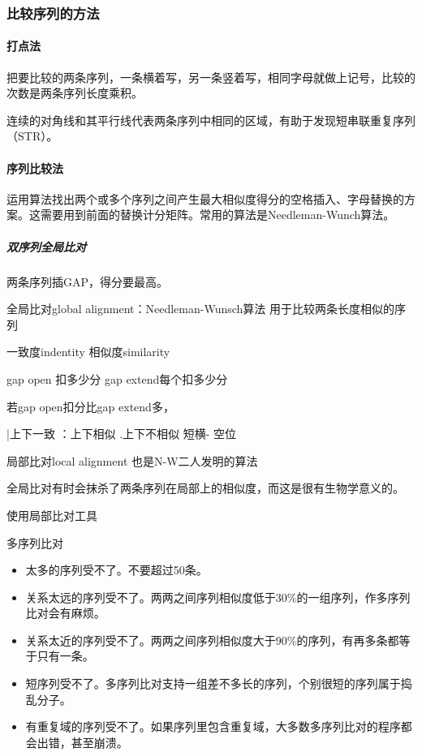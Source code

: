 \subsubsection{比较序列的方法}

\paragraph{打点法}

把要比较的两条序列，一条横着写，另一条竖着写，相同字母就做上记号，比较的次数是两条序列长度乘积。

连续的对角线和其平行线代表两条序列中相同的区域，有助于发现短串联重复序列（STR）。

\paragraph{序列比较法}

运用算法找出两个或多个序列之间产生最大相似度得分的空格插入、字母替换的方案。这需要用到前面的替换计分矩阵。常用的算法是Needleman-Wunch算法。

\subparagraph{双序列全局比对}



两条序列插GAP，得分要最高。

全局比对global alignment：Needleman-Wunsch算法 用于比较两条长度相似的序列

一致度indentity 相似度similarity

gap open 扣多少分  gap extend每个扣多少分

若gap open扣分比gap extend多，

|上下一致 ：上下相似 .上下不相似 短横- 空位

局部比对local alignment
也是N-W二人发明的算法

全局比对有时会抹杀了两条序列在局部上的相似度，而这是很有生物学意义的。

使用局部比对工具

多序列比对

\begin{itemize}
	\item 太多的序列受不了。不要超过50条。
	\item 关系太远的序列受不了。两两之间序列相似度低于30\%的一组序列，作多序列比对会有麻烦。
	\item 关系太近的序列受不了。两两之间序列相似度大于90\%的序列，有再多条都等于只有一条。
	\item 短序列受不了。多序列比对支持一组差不多长的序列，个别很短的序列属于捣乱分子。
	\item 有重复域的序列受不了。如果序列里包含重复域，大多数多序列比对的程序都会出错，甚至崩溃。
\end{itemize}

